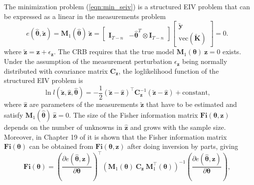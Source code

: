 The minimization problem (\ref{eqn:min_seiv}) is a structured EIV problem that can be expressed as a linear in the measurements problem \citep{Pintelon12Book}
\begin{equation} e (\widehat{\bm{\theta}}, \widetilde{\mathbf{z}}) = \mathbf{M}_1( \widehat{\bm{\theta}} ) \ \widetilde{\mathbf{z}} = \begin{bmatrix} \mathbf{I}_{T-n} & - \widehat{\bm{\theta}}^T \otimes \mathbf{I}_{T-n} \end{bmatrix} \begin{bmatrix} \widetilde{\mathbf{y}} \\ \mathrm{vec} ( \widetilde{\mathbf{K}} ) \end{bmatrix} = 0 . \label{eqn:M1vecyK} \end{equation}
where $\widetilde{\mathbf{z}} = \mathbf{z} + \epsilon_{\mathbf{z}}$.
The CRB requires that the true model $\mathbf{M}_1( \bm{\theta} ) \ \mathbf{z} = 0$ exists.
Under the assumption of the measurement perturbation $\epsilon_{\mathbf{z}}$ being normally distributed with covariance matrix $\mathbf{C}_{\mathbf{z}}$, the loglikelihood function of the structured EIV problem is
\begin{equation} \ln{ l(\widetilde{\mathbf{z}}, \widehat{\mathbf{z}}, \widehat{\bm{\theta}}) } = - \frac{1}{2} \left( \widetilde{\mathbf{z}} - \widehat{\mathbf{z}} \right)^\top \mathbf{C}_{\mathbf{z}}^{-1} \left( \widetilde{\mathbf{z}} - \widehat{\mathbf{z}} \right) + \mathrm{constant}, \end{equation}
where $\widehat{\mathbf{z}}$ are parameters of the measurements $\widetilde{\mathbf{z}}$ that have to be estimated and satisfy $\mathbf{M}_1( \widehat{\bm{\theta}} ) \ \widehat{\mathbf{z}} = 0$.
The size of the Fisher information matrix $\mathbf{Fi}(\bm{\theta}, \mathbf{z})$ depends on the number of unknowns in $\widehat{\mathbf{z}}$ and grows with the sample size.
Moreover, in Chapter 19 of \citep{Pintelon12Book} it is shown that the Fisher information matrix $\mathbf{Fi}(\bm{\theta})$ can be obtained from $\mathbf{Fi}(\bm{\theta}, \mathbf{z})$ after doing inversion by parts, giving
\begin{equation} \mathbf{Fi}(\bm{\theta}) = \left( \frac{\partial e (\widehat{\bm{\theta}}, \mathbf{z}) }{\partial \bm{\theta} } \right)^\top \left( \mathbf{M}_1( \bm{\theta} ) \ \mathbf{C}_{\mathbf{z}} \ \mathbf{M}_1^\top( \bm{\theta} ) \right)^{-1} \left( \frac{\partial e (\widehat{\bm{\theta}}, \mathbf{z}) }{\partial \bm{\theta} } \right) 
 , \label{eqn:FIM} \end{equation} 
